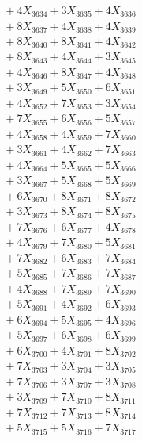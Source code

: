 \documentclass[a4paper,10pt]{article}
\begin{document}
{\begin{align}
&\;  + 4 X_{3634} + 3 X_{3635} + 4 X_{3636} \\[0.3ex]
&\;  + 8 X_{3637} + 4 X_{3638} + 4 X_{3639} \\[0.5ex]\allowbreak
&\;  + 8 X_{3640} + 8 X_{3641} + 4 X_{3642} \\[0.3ex]
&\;  + 8 X_{3643} + 4 X_{3644} + 3 X_{3645} \\[0.3ex]
&\;  + 4 X_{3646} + 8 X_{3647} + 4 X_{3648} \\[0.3ex]
&\;  + 3 X_{3649} + 5 X_{3650} + 6 X_{3651} \\[0.3ex]
&\;  + 4 X_{3652} + 7 X_{3653} + 3 X_{3654} \\[0.3ex]
&\;  + 7 X_{3655} + 6 X_{3656} + 5 X_{3657} \\[0.3ex]
&\;  + 4 X_{3658} + 4 X_{3659} + 7 X_{3660} \\[0.3ex]
&\;  + 3 X_{3661} + 4 X_{3662} + 7 X_{3663} \\[0.3ex]
&\;  + 4 X_{3664} + 5 X_{3665} + 5 X_{3666} \\[0.3ex]
&\;  + 3 X_{3667} + 5 X_{3668} + 5 X_{3669} \\[0.5ex]\allowbreak
&\;  + 6 X_{3670} + 8 X_{3671} + 8 X_{3672} \\[0.3ex]
&\;  + 3 X_{3673} + 8 X_{3674} + 8 X_{3675} \\[0.3ex]
&\;  + 7 X_{3676} + 6 X_{3677} + 4 X_{3678} \\[0.3ex]
&\;  + 4 X_{3679} + 7 X_{3680} + 5 X_{3681} \\[0.3ex]
&\;  + 7 X_{3682} + 6 X_{3683} + 7 X_{3684} \\[0.3ex]
&\;  + 5 X_{3685} + 7 X_{3686} + 7 X_{3687} \\[0.3ex]
&\;  + 4 X_{3688} + 7 X_{3689} + 7 X_{3690} \\[0.3ex]
&\;  + 5 X_{3691} + 4 X_{3692} + 6 X_{3693} \\[0.3ex]
&\;  + 6 X_{3694} + 5 X_{3695} + 4 X_{3696} \\[0.3ex]
&\;  + 5 X_{3697} + 6 X_{3698} + 6 X_{3699} \\[0.5ex]\allowbreak
&\;  + 6 X_{3700} + 4 X_{3701} + 8 X_{3702} \\[0.3ex]
&\;  + 7 X_{3703} + 3 X_{3704} + 3 X_{3705} \\[0.3ex]
&\;  + 7 X_{3706} + 3 X_{3707} + 3 X_{3708} \\[0.3ex]
&\;  + 3 X_{3709} + 7 X_{3710} + 8 X_{3711} \\[0.3ex]
&\;  + 7 X_{3712} + 7 X_{3713} + 8 X_{3714} \\[0.3ex]
&\;  + 5 X_{3715} + 5 X_{3716} + 7 X_{3717} \\[0.3ex]

\end{align}}
\end{document}
